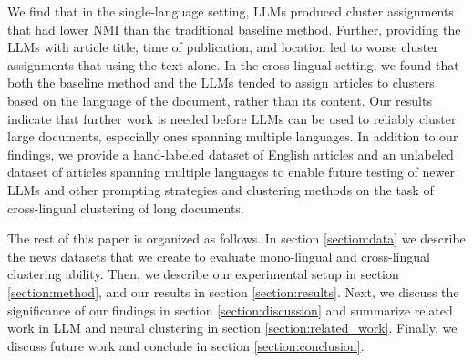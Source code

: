 We find that in the single-language setting, LLMs produced cluster assignments that had lower \ac{NMI} than the traditional baseline method.
Further, providing the LLMs with article title, time of publication, and location led to worse cluster assignments that using the text alone.
In the cross-lingual setting, we found that both the baseline method and the LLMs tended to assign articles to clusters based on the language of the document, rather than its content.
Our results indicate that further work is needed before LLMs can be used to reliably cluster large documents, especially ones spanning multiple languages.
In addition to our findings, we provide a hand-labeled dataset of English articles and an unlabeled dataset of articles spanning multiple languages to enable future testing of newer LLMs and other prompting strategies and clustering methods on the task of cross-lingual clustering of long documents.

The rest of this paper is organized as follows.
In section \ref{section:data} we describe the news datasets that we create to evaluate mono-lingual and cross-lingual clustering ability.
Then, we describe our experimental setup in section \ref{section:method}, and our results in section \ref{section:results}.
Next, we discuss the significance of our findings in section \ref{section:discussion} and summarize related work in LLM and neural clustering in section \ref{section:related_work}.
Finally, we discuss future work and conclude in section \ref{section:conclusion}.